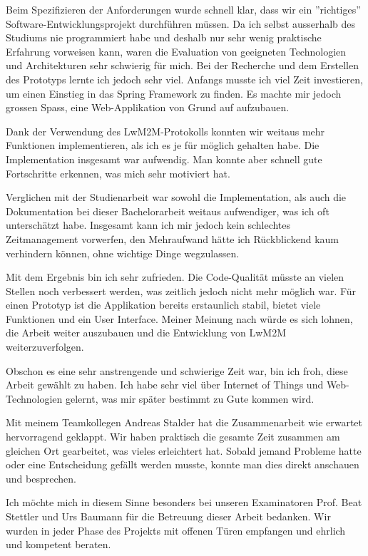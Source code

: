 Beim Spezifizieren der Anforderungen wurde schnell klar, dass wir ein ''richtiges'' Software-Entwicklungsprojekt durchführen müssen. Da ich selbst ausserhalb des Studiums nie programmiert habe und deshalb nur sehr wenig praktische Erfahrung vorweisen kann, waren die Evaluation von geeigneten Technologien und Architekturen sehr schwierig für mich. Bei der Recherche und dem Erstellen des Prototyps lernte ich jedoch sehr viel. Anfangs musste ich viel Zeit investieren, um einen Einstieg in das Spring Framework zu finden. Es machte mir jedoch grossen Spass, eine Web-Applikation von Grund auf aufzubauen.

Dank der Verwendung des LwM2M-Protokolls konnten wir weitaus mehr Funktionen implementieren, als ich es je für möglich gehalten habe. Die Implementation insgesamt war aufwendig. Man konnte aber schnell gute Fortschritte erkennen, was mich sehr motiviert hat.

Verglichen mit der Studienarbeit war sowohl die Implementation, als auch die Dokumentation bei dieser Bachelorarbeit weitaus aufwendiger, was ich oft unterschätzt habe. Insgesamt kann ich mir jedoch kein schlechtes Zeitmanagement vorwerfen, den Mehraufwand hätte ich Rückblickend kaum verhindern können, ohne wichtige Dinge wegzulassen.

Mit dem Ergebnis bin ich sehr zufrieden. Die Code-Qualität müsste an vielen Stellen noch verbessert werden, was zeitlich jedoch nicht mehr möglich war. Für einen Prototyp ist die Applikation bereits erstaunlich stabil, bietet viele Funktionen und ein User Interface. Meiner Meinung nach würde es sich lohnen, die Arbeit weiter auszubauen und die Entwicklung von LwM2M weiterzuverfolgen.

Obschon es eine sehr anstrengende und schwierige Zeit war, bin ich froh, diese Arbeit gewählt zu haben. Ich habe sehr viel über Internet of Things und Web-Technologien gelernt, was mir später bestimmt zu Gute kommen wird.

Mit meinem Teamkollegen Andreas Stalder hat die Zusammenarbeit wie erwartet hervorragend geklappt. Wir haben praktisch die gesamte Zeit zusammen am gleichen Ort gearbeitet, was vieles erleichtert hat. Sobald jemand Probleme hatte oder eine Entscheidung gefällt werden musste, konnte man dies direkt anschauen und besprechen. 

Ich möchte mich in diesem Sinne besonders bei unseren Examinatoren Prof. Beat Stettler und Urs Baumann für die Betreuung dieser Arbeit bedanken. Wir wurden in jeder Phase des Projekts mit offenen Türen empfangen und ehrlich und kompetent beraten.